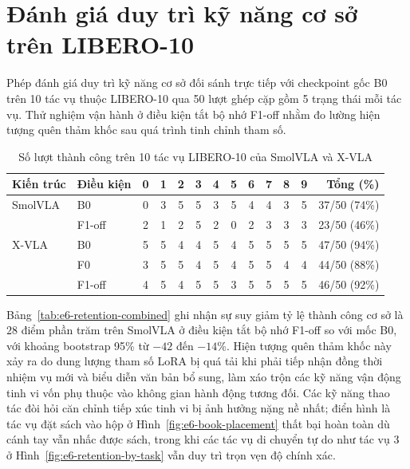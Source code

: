 \section{Đánh giá duy trì kỹ năng cơ sở trên LIBERO-10}
\label{sec:e6-retention}

Phép đánh giá duy trì kỹ năng cơ sở đối sánh trực tiếp với checkpoint gốc B0 trên 10 tác vụ thuộc LIBERO-10 qua 50 lượt ghép cặp gồm 5 trạng thái mỗi tác vụ. Thử nghiệm vận hành ở điều kiện tắt bộ nhớ F1-off nhằm đo lường hiện tượng quên thảm khốc sau quá trình tinh chỉnh tham số.

\begin{table}[htbp]
\centering\small
\caption{Số lượt thành công trên 10 tác vụ LIBERO-10 của SmolVLA và X-VLA}
\label{tab:e6-retention-combined}
\label{tab:e6-retention-results}
\label{tab:xvla-e6-results}
\setlength{\tabcolsep}{2.5pt}
\begin{tabular}{l|l|*{10}{c}|r}
\toprule
\textbf{Kiến trúc} & \textbf{Điều kiện} & \textbf{0} & \textbf{1} & \textbf{2} & \textbf{3} & \textbf{4} & \textbf{5} & \textbf{6} & \textbf{7} & \textbf{8} & \textbf{9} & \textbf{Tổng (\%)} \\
\midrule
SmolVLA & B0     & 0 & 3 & 5 & 5 & 3 & 5 & 4 & 4 & 3 & 5 & 37/50 (74\%) \\
        & F1-off & 2 & 1 & 2 & 5 & 2 & 0 & 2 & 3 & 3 & 3 & 23/50 (46\%) \\
\midrule
X-VLA   & B0     & 5 & 5 & 4 & 4 & 5 & 4 & 5 & 5 & 5 & 5 & 47/50 (94\%) \\
        & F0     & 3 & 5 & 5 & 4 & 5 & 4 & 5 & 5 & 4 & 4 & 44/50 (88\%) \\
        & F1-off & 4 & 5 & 4 & 5 & 5 & 3 & 5 & 5 & 5 & 5 & 46/50 (92\%) \\
\bottomrule
\end{tabular}
\end{table}

Bảng~\ref{tab:e6-retention-combined} ghi nhận sự suy giảm tỷ lệ thành công cơ sở là $28$ điểm phần trăm trên SmolVLA ở điều kiện tắt bộ nhớ F1-off so với mốc B0, với khoảng bootstrap 95\% từ $-42$ đến $-14$\%. Hiện tượng quên thảm khốc này xảy ra do dung lượng tham số LoRA bị quá tải khi phải tiếp nhận đồng thời nhiệm vụ mới và biểu diễn văn bản bổ sung, làm xáo trộn các kỹ năng vận động tinh vi vốn phụ thuộc vào không gian hành động tương đối. Các kỹ năng thao tác đòi hỏi căn chỉnh tiếp xúc tinh vi bị ảnh hưởng nặng nề nhất; điển hình là tác vụ đặt sách vào hộp ở Hình~\ref{fig:e6-book-placement} thất bại hoàn toàn dù cánh tay vẫn nhấc được sách, trong khi các tác vụ di chuyển tự do như tác vụ 3 ở Hình~\ref{fig:e6-retention-by-task} vẫn duy trì trọn vẹn độ chính xác.

